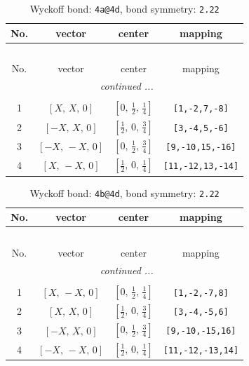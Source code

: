 \documentclass[fleqn,8pt]{jsarticle}
\begin{document}
\begin{longtable}{cccc}
\caption{Wyckoff bond: {\tt 4a@4d}, bond symmetry: {\tt 2.22}}
 \\
 \hline \hline
No. & vector & center & mapping \\ \hline \endfirsthead

\multicolumn{3}{l}{\tablename\ \thetable{}} \\
 \hline \hline
No. & vector & center & mapping \\ \hline \endhead

 \hline \hline
\multicolumn{3}{r}{\footnotesize\it continued ...} \\ \endfoot

 \hline \hline
\multicolumn{3}{r}{} \\ \endlastfoot

1 & $\left[ X,\, X,\, 0 \right]$ & $\left[ 0,\, \frac{1}{2},\, \frac{1}{4} \right]$ & {\tt [1,-2,7,-8]} \\ \hline
2 & $\left[ - X,\, X,\, 0 \right]$ & $\left[ \frac{1}{2},\, 0,\, \frac{3}{4} \right]$ & {\tt [3,-4,5,-6]} \\ \hline
3 & $\left[ - X,\, - X,\, 0 \right]$ & $\left[ 0,\, \frac{1}{2},\, \frac{3}{4} \right]$ & {\tt [9,-10,15,-16]} \\ \hline
4 & $\left[ X,\, - X,\, 0 \right]$ & $\left[ \frac{1}{2},\, 0,\, \frac{1}{4} \right]$ & {\tt [11,-12,13,-14]} \\
\end{longtable}
\renewcommand{\arraystretch}{1.2}
\begin{longtable}{cccc}
\caption{Wyckoff bond: {\tt 4b@4d}, bond symmetry: {\tt 2.22}}
 \\
 \hline \hline
No. & vector & center & mapping \\ \hline \endfirsthead

\multicolumn{3}{l}{\tablename\ \thetable{}} \\
 \hline \hline
No. & vector & center & mapping \\ \hline \endhead

 \hline \hline
\multicolumn{3}{r}{\footnotesize\it continued ...} \\ \endfoot

 \hline \hline
\multicolumn{3}{r}{} \\ \endlastfoot

1 & $\left[ X,\, - X,\, 0 \right]$ & $\left[ 0,\, \frac{1}{2},\, \frac{1}{4} \right]$ & {\tt [1,-2,-7,8]} \\ \hline
2 & $\left[ X,\, X,\, 0 \right]$ & $\left[ \frac{1}{2},\, 0,\, \frac{3}{4} \right]$ & {\tt [3,-4,-5,6]} \\ \hline
3 & $\left[ - X,\, X,\, 0 \right]$ & $\left[ 0,\, \frac{1}{2},\, \frac{3}{4} \right]$ & {\tt [9,-10,-15,16]} \\ \hline
4 & $\left[ - X,\, - X,\, 0 \right]$ & $\left[ \frac{1}{2},\, 0,\, \frac{1}{4} \right]$ & {\tt [11,-12,-13,14]} \\
\end{longtable}
\end{document}
